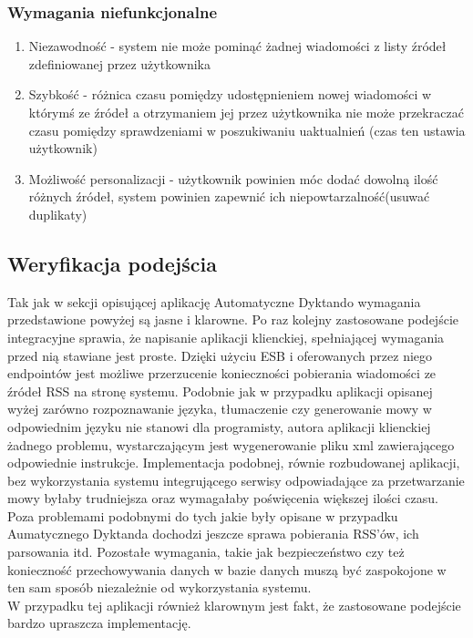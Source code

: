 \subsubsection{Wymagania niefunkcjonalne}
\begin{enumerate}
	\item Niezawodność - system nie może pominąć żadnej wiadomości z listy źródeł zdefiniowanej przez użytkownika
	\item Szybkość - różnica czasu pomiędzy udostępnieniem nowej wiadomości w którymś ze źródeł a otrzymaniem jej przez użytkownika nie może przekraczać czasu pomiędzy sprawdzeniami w poszukiwaniu uaktualnień (czas ten ustawia użytkownik)
	\item Możliwość personalizacji - użytkownik powinien móc dodać dowolną ilość różnych źródeł, system powinien zapewnić ich niepowtarzalność(usuwać duplikaty)
\end{enumerate}

\subsection{Weryfikacja podejścia}
Tak jak w sekcji opisującej aplikację Automatyczne Dyktando wymagania przedstawione powyżej są jasne i klarowne. Po raz kolejny zastosowane podejście integracyjne sprawia, że napisanie aplikacji klienckiej, spełniającej wymagania przed nią stawiane jest proste. Dzięki użyciu ESB i oferowanych przez niego endpointów jest możliwe przerzucenie konieczności pobierania wiadomości ze źródeł RSS na stronę systemu. Podobnie jak w przypadku aplikacji opisanej wyżej zarówno rozpoznawanie języka, tłumaczenie czy generowanie mowy w odpowiednim języku nie stanowi dla programisty, autora aplikacji klienckiej żadnego problemu, wystarczającym jest wygenerowanie pliku xml zawierającego odpowiednie instrukcje. Implementacja podobnej, równie rozbudowanej aplikacji, bez wykorzystania systemu integrującego serwisy odpowiadające za przetwarzanie mowy byłaby trudniejsza oraz wymagałaby poświęcenia większej ilości czasu. Poza problemami podobnymi do tych jakie były opisane w przypadku Aumatycznego Dyktanda dochodzi jeszcze sprawa pobierania RSS'ów, ich parsowania itd. Pozostałe wymagania, takie jak bezpieczeństwo czy też konieczność przechowywania danych w bazie danych muszą być zaspokojone w ten sam sposób niezależnie od wykorzystania systemu. \\
W przypadku tej aplikacji również klarownym jest fakt, że zastosowane podejście bardzo upraszcza implementację.



